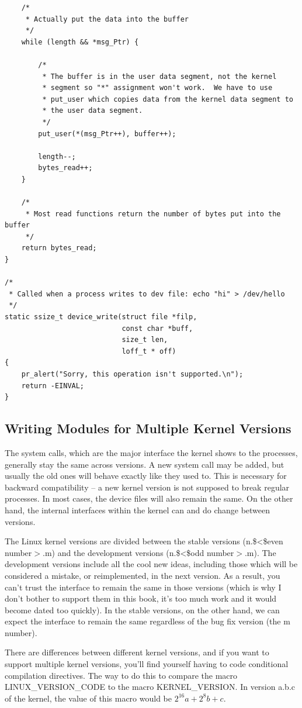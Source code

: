 \documentclass[11pt]{article}
\begin{document}
\begin{verbatim}
    /*
     * Actually put the data into the buffer
     */
    while (length && *msg_Ptr) {

        /*
         * The buffer is in the user data segment, not the kernel
         * segment so "*" assignment won't work.  We have to use
         * put_user which copies data from the kernel data segment to
         * the user data segment.
         */
        put_user(*(msg_Ptr++), buffer++);

        length--;
        bytes_read++;
    }

    /*
     * Most read functions return the number of bytes put into the buffer
     */
    return bytes_read;
}

/*
 * Called when a process writes to dev file: echo "hi" > /dev/hello
 */
static ssize_t device_write(struct file *filp,
                            const char *buff,
                            size_t len,
                            loff_t * off)
{
    pr_alert("Sorry, this operation isn't supported.\n");
    return -EINVAL;
}
\end{verbatim}

\subsection*{Writing Modules for Multiple Kernel Versions}
\label{sec-6-6}
The system calls, which are the major interface the kernel shows to the processes, generally stay the same across versions. A new system call may be added, but usually the old ones will behave exactly like they used to. This is necessary for backward compatibility -- a new kernel version is not supposed to break regular processes. In most cases, the device files will also remain the same. On the other hand, the internal interfaces within the kernel can and do change between versions.

The Linux kernel versions are divided between the stable versions (n.\$<\$even number$>$.m) and the development versions (n.\$<\$odd number$>$.m). The development versions include all the cool new ideas, including those which will be considered a mistake, or reimplemented, in the next version. As a result, you can't trust the interface to remain the same in those versions (which is why I don't bother to support them in this book, it's too much work and it would become dated too quickly). In the stable versions, on the other hand, we can expect the interface to remain the same regardless of the bug fix version (the m number).

There are differences between different kernel versions, and if you want to support multiple kernel versions, you'll find yourself having to code conditional compilation directives. The way to do this to compare the macro LINUX\_VERSION\_CODE to the macro KERNEL\_VERSION. In version a.b.c of the kernel, the value of this macro would be $2^{16}a+2^{8}b+c$.
\end{document}
